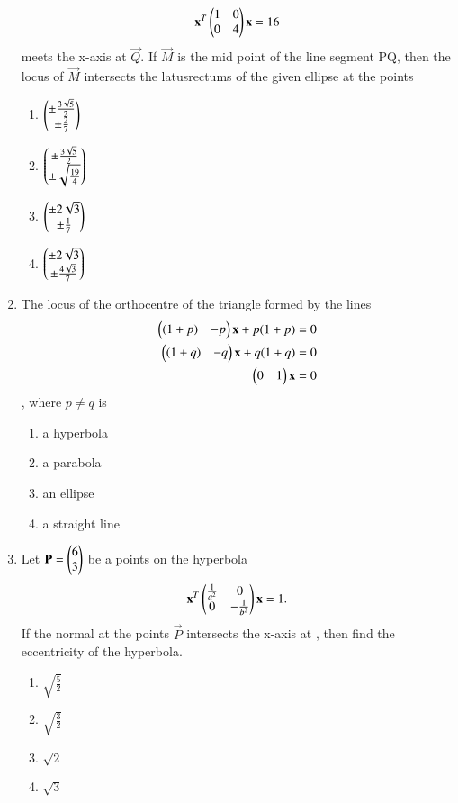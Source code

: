 \documentclass[journal,12pt,twocolumn]{IEEEtran}
\begin{document}
\begin{enumerate}[label=\arabic*]
\begin{align}
    \mathbf{x}^T\begin{pmatrix}1&0\\0&4\end{pmatrix}\mathbf{x}=16
    \end{align} meets the x-axis at $\vec{Q}$. If $\vec{M}$ is the mid point of the line segment PQ, then the locus of $\vec{M}$ intersects the latusrectums of the given ellipse at the points
    \begin{enumerate}
    \item $\begin{pmatrix}\pm\frac{3\sqrt{5}}{2}\\\pm\frac{2}{7}\end{pmatrix}$
    \item $\begin{pmatrix}\pm\frac{3\sqrt{5}}{2}\\ \pm\sqrt{\frac{19}{4}}\end{pmatrix}$
    \item $\begin{pmatrix}\pm 2\sqrt{3}\\ \pm\frac{1}{7}\end{pmatrix}$
    \item $\begin{pmatrix}\pm 2\sqrt{3}\\ \pm\frac{4\sqrt{3}}{7}\end{pmatrix}$
    \end{enumerate}
    \item The locus of the orthocentre of the triangle formed by the lines 
    \begin{align}
    \begin{pmatrix}(1+p)&-p\end{pmatrix}\mathbf{x}+p(1+p)=0\\
    \begin{pmatrix}(1+q)&-q\end{pmatrix}\mathbf{x}+q(1+q)=0\\
    \begin{pmatrix}0&1\end{pmatrix}\mathbf{x}=0
    \end{align}, where $p\neq q$ is 
    \begin{enumerate}
    \item a hyperbola
    \item a parabola
    \item an ellipse
    \item a straight line
    \end{enumerate}
    \item Let $\mathbf{P}=\begin{pmatrix}6\\3\end{pmatrix}$ be a points on the hyperbola 
    \begin{align}
    \mathbf{x}^T\begin{pmatrix}\frac{1}{a^2}&0\\0&-\frac{1}{b^2}\end{pmatrix}\mathbf{x} =1.
    \end{align} If the normal at the points $\vec{P}$ intersects the x-axis at , then find the eccentricity of the hyperbola.
    \begin{enumerate}
    \item $\sqrt{\frac{5}{2}}$
    \item $\sqrt{\frac{3}{2}}$
    \item $\sqrt{2}$
    \item  $\sqrt{3}$

\end{enumerate}
\end{enumerate}
\end{document}
